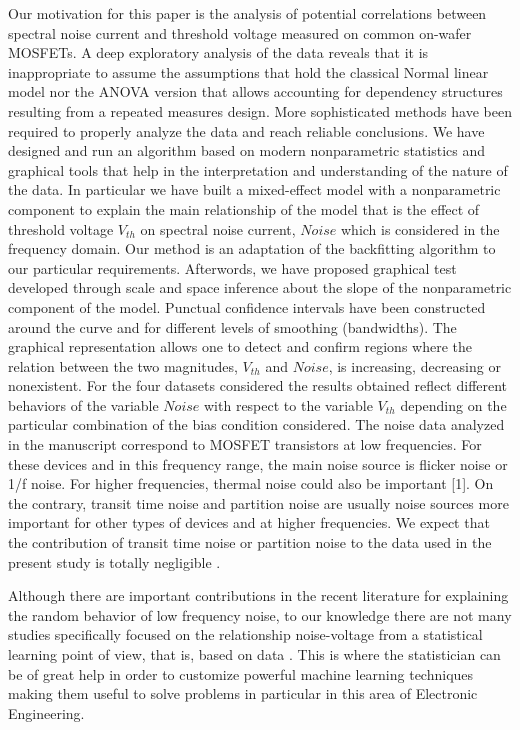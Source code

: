\documentclass[sn-mathphys]{sn-jnl}%
\theoremstyle{thmstyleone}%
\theoremstyle{thmstyletwo}%
\theoremstyle{thmstylethree}%
\begin{document}
Our motivation for this paper is the analysis of potential correlations between spectral noise current and threshold voltage measured on common on-wafer MOSFETs. A deep exploratory analysis of the data reveals that it is inappropriate to assume the assumptions that hold the classical Normal linear model nor the ANOVA version that allows accounting for dependency structures resulting from a repeated measures design. More sophisticated methods have been required to properly analyze the data and reach reliable conclusions.
We have designed and run an algorithm based on modern nonparametric statistics and graphical tools that help in the interpretation and understanding of the nature of the data. In particular we have built a mixed-effect model with a nonparametric component to explain the main relationship of the model that is the effect of threshold voltage $V_{th}$ on spectral noise current, $Noise$ which is considered in the frequency domain. Our method is an adaptation of the backfitting algorithm to our particular requirements. Afterwords, we have proposed 
graphical test developed through scale and space inference about the slope of the nonparametric component of the model. Punctual  confidence intervals have been constructed around the curve and for different levels of smoothing (bandwidths). The graphical representation allows one to detect and confirm regions where the relation between the two magnitudes, $V_{th}$ and $Noise$, is increasing, decreasing or nonexistent. For the four datasets considered the results obtained reflect different behaviors of the variable $Noise$ with respect to the variable $V_{th}$ depending on the particular combination of the bias condition considered.
The noise data analyzed in the manuscript correspond to MOSFET transistors at low frequencies. For these devices and in this frequency range, the main noise source is flicker noise or 1/f noise. For higher frequencies, thermal noise could also be important [1]. On the contrary, transit time noise and partition noise are usually noise sources more important for other types of devices and at higher frequencies. We expect that the contribution of transit time noise or partition noise to the data used in the present study is totally negligible \cite{GHLM2009}.


Although there are important contributions in the recent literature for explaining the random behavior of low frequency noise, to our knowledge there are not many studies specifically focused on the relationship noise-voltage from a statistical learning point of view, that is, based on data \cite{Duty2016}. This is where the statistician can be of great help in order to customize powerful machine learning techniques making them useful to solve problems in particular in this area of Electronic Engineering.  
\end{document}
